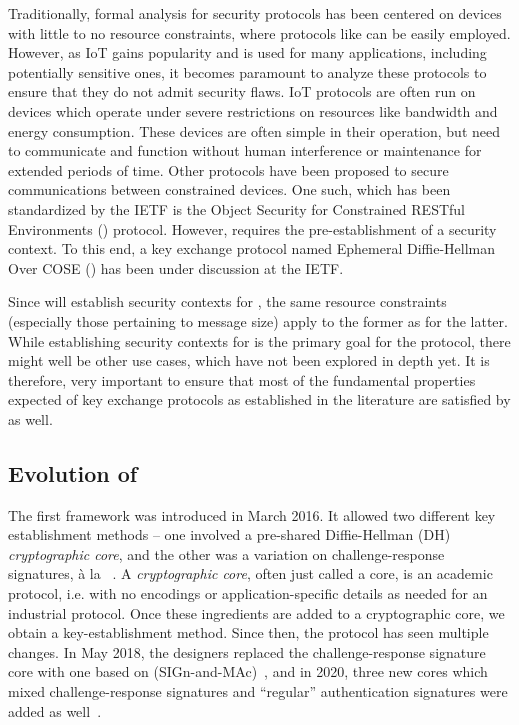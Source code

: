 Traditionally, formal analysis for security protocols has been centered on devices with little to no resource constraints, where protocols like \mDandTls{} can be easily employed. 
%
However, as IoT gains popularity and is used for many applications, including potentially sensitive ones, it becomes paramount to analyze these protocols to ensure that they do not admit security flaws.
%
IoT protocols are often run on devices which operate under severe restrictions on resources like bandwidth and energy consumption. These devices are often simple in their operation, but need to communicate and function without human interference or maintenance for extended periods of time.
%
Other protocols have been proposed to secure communications between constrained devices. One such, which has been standardized by the IETF is the Object Security for Constrained RESTful Environments (\mOscore{}) protocol. 
%
However, \mOscore{} requires the pre-establishment of a security context. To this end, a key exchange protocol named Ephemeral Diffie-Hellman Over COSE (\mEdhoc{}) has been under discussion at the IETF. 

%
Since \mEdhoc{} will establish security contexts for \mOscore{}, the same resource constraints (especially those pertaining to message size) apply to the former as for the latter.
%
While establishing security contexts for \mOscore{} is the primary goal for the \mEdhoc{} protocol, there might well be other use cases, which have not been explored in depth yet.
%
It is therefore, very important to ensure that most of the fundamental properties expected of key exchange protocols as established in the literature are satisfied by \mEdhoc{} as well.
\subsection{Evolution of \mEdhoc}
\label{sec:edhocevol}
The first \mEdhoc{} framework was introduced in March 2016. 
%
It allowed two different key establishment methods -- one involved a pre-shared Diffie-Hellman (DH) \emph{cryptographic core}, and the other was a variation on challenge-response signatures, {\`a} la \mOptls{}~\cite{DBLP:conf/eurosp/KrawczykW16}. 
%
A \emph{cryptographic core}, often just called a core, is an academic protocol, i.e. with no encodings or application-specific details as needed for an industrial protocol. 
%
Once these ingredients are added to a cryptographic core, we obtain a key-establishment method.
%
Since then, the protocol has seen multiple changes.
%
In May 2018, the designers replaced the challenge-response signature core with one based on \mSigma{} (SIGn-and-MAc)~\cite{sigma,bruni-analysis-selander-ace-cose-ecdhe-08}, and in 2020, three new cores which mixed challenge-response signatures and ``regular'' authentication signatures were added as well~\cite{our-analysis-selander-lake-edhoc-00}.

